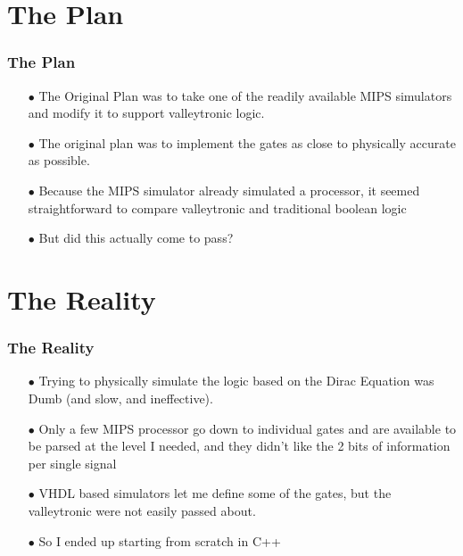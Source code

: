 \documentclass{beamer}
\begin{document}
\section[The Plan]{The Plan}
\begin{frame}
\frametitle{The Plan}

\begin{itemize}
  \item[$\bullet$]The Original Plan was to take one of the readily available MIPS simulators and modify it to support valleytronic logic.
  \vspace*{10pt}
  \item[$\bullet$]The original plan was to implement the gates as close to physically accurate as possible.
  \vspace{10pt}
  \item[$\bullet$]Because the MIPS simulator already simulated a processor, it seemed straightforward to compare valleytronic and traditional boolean logic
 \vspace{10pt}
\item[$\bullet$] But did this actually come to pass? 
\end{itemize}

\end{frame}

\section[The Reality]{The Reality}
\begin{frame}
\frametitle{The Reality}

\begin{itemize}
  \item[$\bullet$]Trying to physically simulate the logic based on the Dirac Equation was Dumb (and slow, and ineffective).
  \vspace*{10pt}
  \item[$\bullet$]Only a few MIPS processor go down to individual gates and are available to be parsed at the level I needed, and they didn't like the 2 bits of information per single signal
  \vspace{10pt}
  \item[$\bullet$]VHDL based simulators let me define some of the gates, but the valleytronic were not easily passed about.
 \vspace{10pt}
\item[$\bullet$] So I ended up starting from scratch in C++
\end{itemize}

\end{frame}
\end{document}
